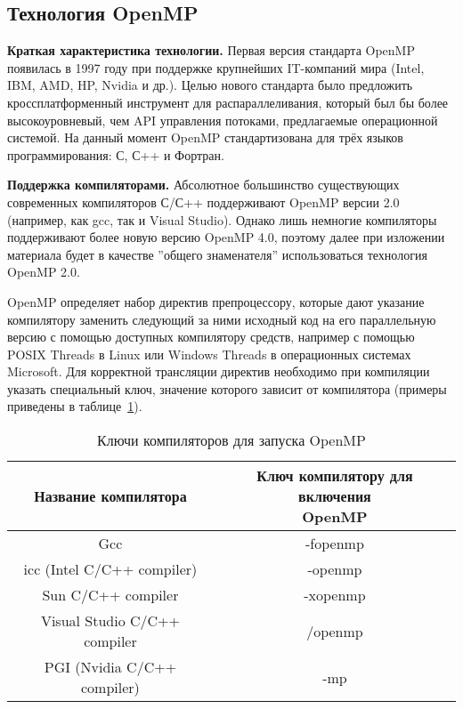 { %
	\subsection{Технология OpenMP}
	\label{OpenMP:section}
	\par\textbf{Краткая характеристика технологии.} Первая версия стандарта OpenMP появилась в 1997 году при поддержке крупнейших IT-компаний мира (Intel, IBM, AMD, HP, Nvidia и др.). Целью нового стандарта было предложить кроссплатформенный инструмент для распараллеливания, который был бы более высокоуровневый, чем API управления потоками, предлагаемые операционной системой. На данный момент OpenMP стандартизована для трёх языков программирования: С, С++ и Фортран.
	\par\textbf{Поддержка компиляторами.} Абсолютное большинство существующих современных компиляторов С/С++ поддерживают OpenMP версии 2.0 (например, как gcc, так и Visual Studio). Однако лишь немногие компиляторы поддерживают более новую версию OpenMP 4.0, поэтому далее при изложении материала будет в качестве ''общего знаменателя'' использоваться технология OpenMP 2.0.
	\par OpenMP определяет набор директив препроцессору, которые дают указание компилятору заменить следующий за ними исходный код на его параллельную версию с помощью доступных компилятору средств, например с помощью POSIX Threads в Linux или Windows Threads в операционных системах Microsoft. Для корректной трансляции директив необходимо при компиляции указать специальный ключ, значение которого зависит от компилятора (примеры приведены в таблице~\ref{compilerOpenMP:table}).
	\begin{table}[H]
		\caption{Ключи компиляторов для запуска OpenMP}
		\label{compilerOpenMP:table}
		\begin{center}
			\begin{tabular}{|c|c|}
				\hline
				\textbf{Название компилятора} & \specialcell{\textbf{Ключ компилятору для включения} \\  \textbf{OpenMP}} \\
				\hline
				Gcc & -fopenmp \\
				\hline
				icc (Intel C/C++ compiler) & -openmp \\
				\hline
				Sun C/C++ compiler & -xopenmp \\
				\hline
				Visual Studio C/C++ compiler & /openmp \\
				\hline
				PGI (Nvidia C/C++ compiler) & -mp \\
				\hline
			\end{tabular}

\end{center}
\end{table}}
